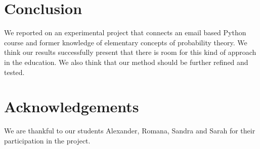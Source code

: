 \documentclass[]{interact}
\theoremstyle{plain}%
\theoremstyle{definition}
\theoremstyle{remark}
\begin{document}
\section{Conclusion}

We reported on an experimental project that connects an email based Python course
and former knowledge of elementary concepts of probability theory.
We think our results successfully present that there is room for this kind of approach
in the education. We also think that our method should be further refined and tested.

\section*{Acknowledgements}

We are thankful to our students Alexander, Romana, Sandra and Sarah
for their participation in the project.

\begin{thebibliography}{99}

\end{thebibliography}
\end{document}
